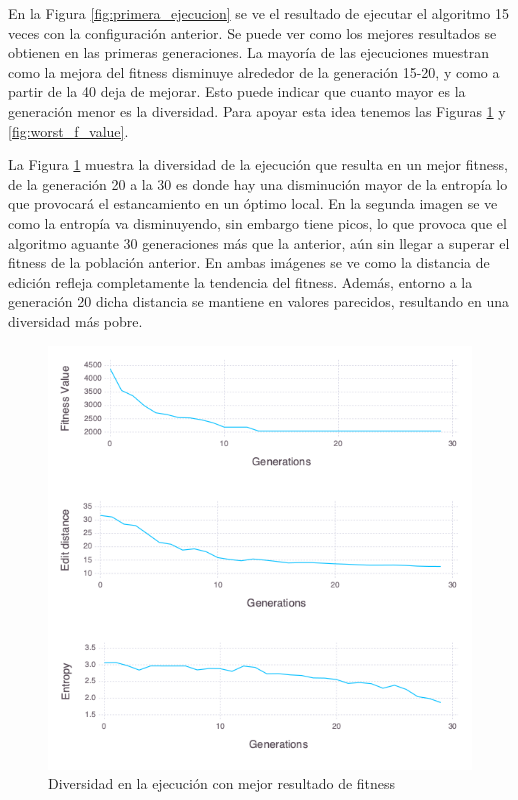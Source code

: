En la Figura \ref{fig:primera_ejecucion} se ve el resultado de ejecutar el algoritmo 15 veces con la configuración anterior.
Se puede ver como los mejores resultados se obtienen en las primeras generaciones. La mayoría de las ejecuciones muestran como la mejora
del fitness disminuye alrededor de la generación 15-20, y como a partir de la 40 deja de mejorar. Esto puede indicar que cuanto mayor es la generación menor es la 
diversidad. Para apoyar esta idea tenemos las Figuras \ref{fig:best_f_value} y \ref{fig:worst_f_value}. 

La Figura \ref{fig:best_f_value} muestra la diversidad de la ejecución que resulta en un mejor fitness, de la generación 20 a la 30 es donde hay una 
disminución mayor de la entropía lo que provocará el estancamiento en un óptimo local. En la segunda imagen se ve como la entropía va disminuyendo, sin 
embargo tiene picos, lo que provoca que el algoritmo aguante 30 generaciones más que la anterior, aún sin llegar a superar el fitness de la población anterior. En
ambas imágenes se ve como la distancia de edición refleja completamente la tendencia del fitness. Además, entorno a la generación 20 dicha distancia se mantiene
en valores parecidos, resultando en una diversidad más pobre.

\begin{figure}[]
	\centering	
	\includegraphics[scale=0.5]{figuras/config_file_1_Rastrigin_best_f_value.png}
	\caption{ Diversidad en la ejecución con mejor resultado de fitness }
    \label{fig:best_f_value}
\end{figure}

